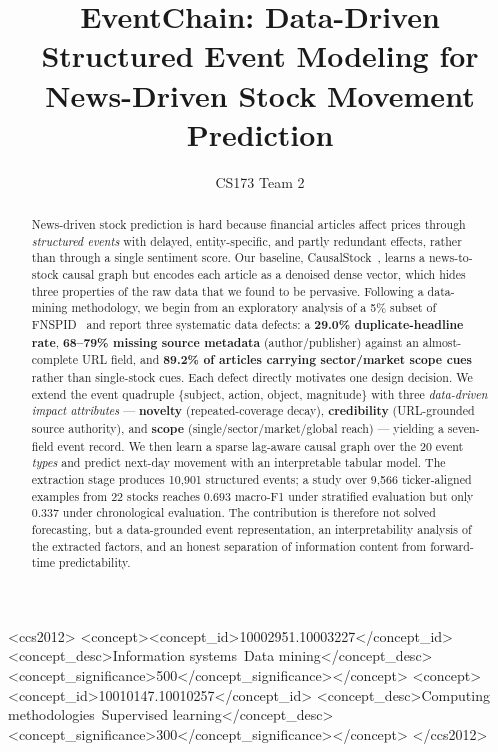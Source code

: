 \documentclass[sigconf,nonacm]{acmart}
\begin{document}
\title{EventChain: Data-Driven Structured Event Modeling for
News-Driven Stock Movement Prediction}

\author{CS173 Team 2}

\begin{abstract}
News-driven stock prediction is hard because financial articles affect
prices through \emph{structured events} with delayed, entity-specific,
and partly redundant effects, rather than through a single sentiment
score. Our baseline, CausalStock~\cite{causalstock}, learns a
news-to-stock causal graph but encodes each article as a denoised dense
vector, which hides three properties of the raw data that we found to be
pervasive. Following a data-mining methodology, we begin from an
exploratory analysis of a 5\% subset of FNSPID~\cite{fnspid} and report
three systematic data defects: a \textbf{29.0\% duplicate-headline rate},
\textbf{68--79\% missing source metadata} (author/publisher) against an
almost-complete URL field, and \textbf{89.2\% of articles carrying
sector/market scope cues} rather than single-stock cues. Each defect
directly motivates one design decision. We extend the event quadruple
$\{$subject, action, object, magnitude$\}$ with three \emph{data-driven
impact attributes} --- \textbf{novelty} (repeated-coverage decay),
\textbf{credibility} (URL-grounded source authority), and \textbf{scope}
(single/sector/market/global reach) --- yielding a seven-field event
record. We then learn a sparse lag-aware causal graph over the 20 event
\emph{types} and predict next-day movement with an interpretable tabular
model. The extraction stage produces 10{,}901 structured events; a study
over 9{,}566 ticker-aligned examples from 22 stocks reaches
$0.693$ macro-F1 under stratified evaluation but only $0.337$ under
chronological evaluation. The contribution is therefore not solved
forecasting, but a data-grounded event representation, an
interpretability analysis of the extracted factors, and an honest
separation of information content from forward-time predictability.
\end{abstract}

\begin{CCSXML}
<ccs2012>
<concept><concept_id>10002951.10003227</concept_id>
<concept_desc>Information systems~Data mining</concept_desc>
<concept_significance>500</concept_significance></concept>
<concept><concept_id>10010147.10010257</concept_id>
<concept_desc>Computing methodologies~Supervised learning</concept_desc>
<concept_significance>300</concept_significance></concept>
</ccs2012>
\end{CCSXML}
\end{document}
